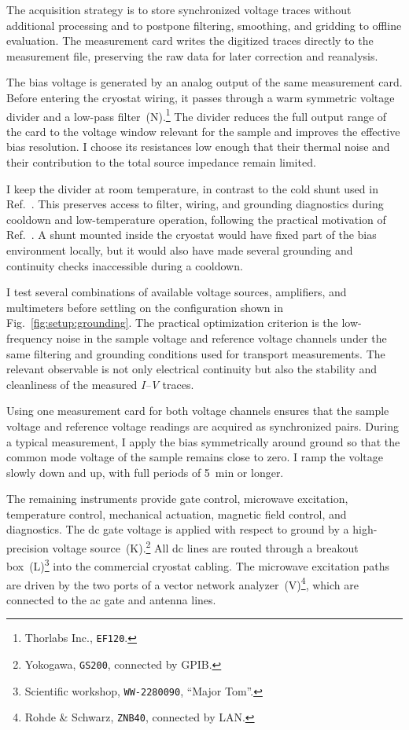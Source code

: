         The acquisition strategy is to store synchronized voltage traces without additional processing and to postpone filtering, smoothing, and gridding to offline evaluation. The measurement card writes the digitized traces directly to the measurement file, preserving the raw data for later correction and reanalysis.

        The bias voltage is generated by an analog output of the same measurement card. Before entering the cryostat wiring, it passes through a warm symmetric voltage divider and a low-pass filter~(N).\footnote{Thorlabs Inc., \texttt{EF120}.} The divider reduces the full output range of the card to the voltage window relevant for the sample and improves the effective bias resolution. I choose its resistances low enough that their thermal noise and their contribution to the total source impedance remain limited.

        I keep the divider at room temperature, in contrast to the cold shunt used in Ref.~\cite{prestel_magnetic_2020}. This preserves access to filter, wiring, and grounding diagnostics during cooldown and low-temperature operation, following the practical motivation of Ref.~\cite{lorenz_wechselspiel_2018}. A shunt mounted inside the cryostat would have fixed part of the bias environment locally, but it would also have made several grounding and continuity checks inaccessible during a cooldown.

        I test several combinations of available voltage sources, amplifiers, and multimeters before settling on the configuration shown in Fig.~\ref{fig:setup:grounding}. The practical optimization criterion is the low-frequency noise in the sample voltage and reference voltage channels under the same filtering and grounding conditions used for transport measurements. The relevant observable is not only electrical continuity but also the stability and cleanliness of the measured \textit{I--V} traces.

        Using one measurement card for both voltage channels ensures that the sample voltage and reference voltage readings are acquired as synchronized pairs. During a typical measurement, I apply the bias symmetrically around ground so that the common mode voltage of the sample remains close to zero. I ramp the voltage slowly down and up, with full periods of \qty{5}{\minute} or longer.

        The remaining instruments provide gate control, microwave excitation, temperature control, mechanical actuation, magnetic field control, and diagnostics. The dc gate voltage is applied with respect to ground by a high-precision voltage source~(K).\footnote{Yokogawa, \texttt{GS200}, connected by GPIB.} All dc lines are routed through a breakout box~(L)\footnote{Scientific workshop, \texttt{WW-2280090}, ``Major Tom''.} into the commercial cryostat cabling. The microwave excitation paths are driven by the two ports of a vector network analyzer~(V)\footnote{Rohde \& Schwarz, \texttt{ZNB40}, connected by LAN.}, which are connected to the ac gate and antenna lines.

